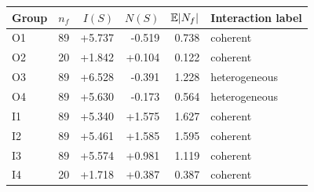 \begin{tabular}{lrrrrl}
\toprule
Group & $n_f$ & $I(S)$ & $N(S)$ & $\mathbb{E}|N_f|$ & Interaction label \\
\midrule
O1 & 89 & +5.737 & -0.519 & 0.738 & coherent \\
O2 & 20 & +1.842 & +0.104 & 0.122 & coherent \\
O3 & 89 & +6.528 & -0.391 & 1.228 & heterogeneous \\
O4 & 89 & +5.630 & -0.173 & 0.564 & heterogeneous \\
I1 & 89 & +5.340 & +1.575 & 1.627 & coherent \\
I2 & 89 & +5.461 & +1.585 & 1.595 & coherent \\
I3 & 89 & +5.574 & +0.981 & 1.119 & coherent \\
I4 & 20 & +1.718 & +0.387 & 0.387 & coherent \\
\bottomrule
\end{tabular}
